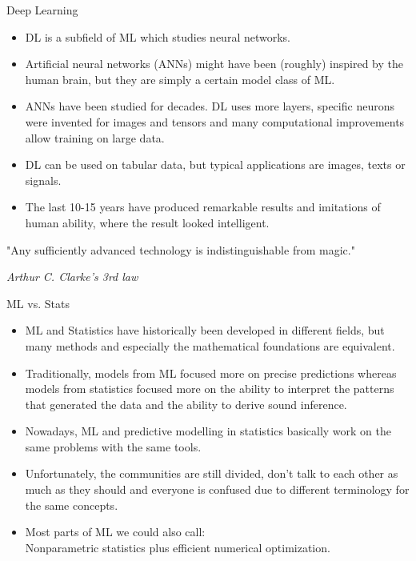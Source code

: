\documentclass[11pt,compress,t,notes=noshow, xcolor=table]{beamer}
\begin{document}
\begin{vbframe}{Deep Learning}

\begin{itemize}
\item DL is a subfield of ML which studies neural networks.
\item Artificial neural networks (ANNs) might have been (roughly) inspired by the human brain, but they are simply a certain model class of ML.
\item ANNs have been studied for decades. DL uses more layers, 
        specific neurons were invented for images and tensors and many computational 
        improvements allow training on large data.
\item DL can be used on tabular data, but typical applications are images, texts or signals. 
\item The last 10-15 years have produced remarkable results and imitations of human ability, where the result looked intelligent. 
\end{itemize}

\lz

"Any sufficiently advanced technology is indistinguishable from magic."
\begin{footnotesize}
\emph{Arthur C. Clarke's 3rd law}
\end{footnotesize}
 

\end{vbframe}


\begin{frame}{ML vs. Stats}


\begin{itemize}
	\item ML and Statistics have historically been developed in different fields, but many
      methods and especially the mathematical foundations are equivalent.
	\item Traditionally, models from ML focused more on precise predictions whereas models from statistics focused more on the ability to interpret the patterns that generated the data and the ability to derive sound inference.
	\item Nowadays, ML and predictive modelling in statistics basically work on the same problems with the same tools.
    \item Unfortunately, the communities are still divided, don't talk to each other as much as they should and everyone is confused due to different terminology for the same concepts.
    \item Most parts of ML we could also call:\\Nonparametric statistics plus efficient numerical optimization.
\end{itemize}

\end{frame}
\end{document}
